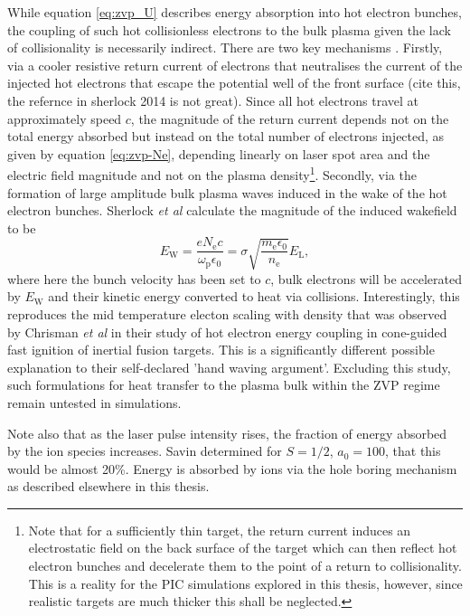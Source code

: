 While equation \ref{eq:zvp_U} describes energy absorption into hot electron bunches, the coupling of such hot collisionless electrons to the bulk plasma given the lack of collisionality is necessarily indirect. There are two key mechanisms \cite{sherlock_2014_IndepthPlasmawaveHeating}. Firstly, via a cooler resistive return current of electrons that neutralises the current of the injected hot electrons that escape the potential well of the front surface (cite this, the refernce in sherlock 2014 is not great). Since all hot electrons travel at approximately speed $c$, the magnitude of the return current depends not on the total energy absorbed but instead on the total number of electrons injected, as given by equation \ref{eq:zvp-Ne}, depending linearly on laser spot area and the electric field magnitude and not on the plasma density\footnote{Note that for a sufficiently thin target, the return current induces an electrostatic field on the back surface of the target which can then reflect hot electron bunches and decelerate them to the point of a return to collisionality. This is a reality for the PIC simulations explored in this thesis, however, since realistic targets are much thicker this shall be neglected.}. Secondly, via the formation of large amplitude bulk plasma waves induced in the wake of the hot electron bunches. Sherlock \textit{et al} \cite{sherlock_2014_IndepthPlasmawaveHeating} calculate the magnitude of the induced wakefield to be
\begin{equation}
	E_\mathrm{W} = \frac{eN_\mathrm{e}c}{\omega_\mathrm{p}\epsilon_0} = \sigma \sqrt{\frac{m_\mathrm{e}\epsilon_0}{n_\mathrm{e}}}E_\mathrm{L},
\end{equation}where here the bunch velocity has been set to $c$, bulk electrons will be accelerated by $E_\mathrm{W}$ and their kinetic energy converted to heat via collisions. Interestingly, this reproduces the mid temperature electon scaling with density that was observed by Chrisman \textit{et al} \cite{chrisman_2008_IntensityScalingHot} in their study of hot electron energy coupling in cone-guided fast ignition of inertial fusion targets. This is a significantly different possible explanation to their self-declared 'hand waving argument'. Excluding this study, such formulations for heat transfer to the plasma bulk within the ZVP regime remain untested in simulations.


Note also that as the laser pulse intensity rises, the fraction of energy absorbed by the ion species increases. Savin \cite{savin_2019_ModellingLaserPlasmaInteractions} determined for $S=1/2$, $a_0 = 100$, that this would be almost 20\%. Energy is absorbed by ions via the hole boring mechanism as described elsewhere in this thesis.


